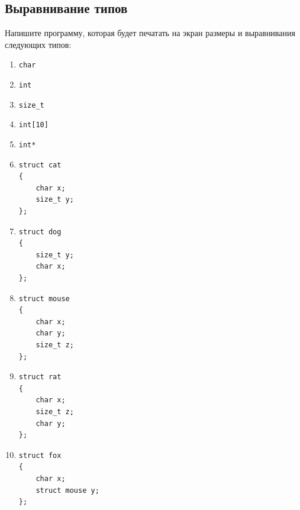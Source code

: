 \documentclass[10pt]{article}
\begin{document}
\subsection{Выравнивание типов}
Напишите программу, которая будет печатать на экран размеры и выравнивания следующих типов:

\begin{multicols}{2}
\begin{enumerate}
\item \texttt{char} 
\item \texttt{int} 
\item \texttt{size\_t} 
\item \texttt{int[10]} 
\item \texttt{int*} 
\item \begin{verbatim}
struct cat
{
    char x;
    size_t y;
};
\end{verbatim}

\item \begin{verbatim}
struct dog
{
    size_t y;
    char x;
};
\end{verbatim}

\item \begin{verbatim}
struct mouse
{
    char x;
    char y;
    size_t z;
};
\end{verbatim}

\item \begin{verbatim}
struct rat
{
    char x;
    size_t z;
    char y;
};
\end{verbatim}

\item \begin{verbatim}
struct fox
{
    char x;
    struct mouse y;
};
\end{verbatim}
\end{enumerate}
\end{multicols}
\end{document}
